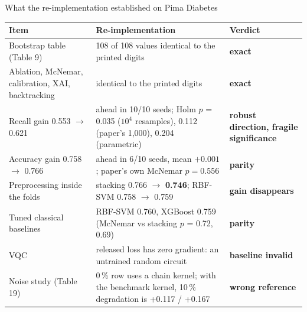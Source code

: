 \documentclass[aspectratio=169,10pt,t,xcolor={table}]{beamer}
\newcommand{\ok}[1]{\textcolor{qgreen}{\textbf{#1}}}
\newcommand{\bad}[1]{\textcolor{qred}{\textbf{#1}}}
\newcommand{\warn}[1]{\textcolor{qamber}{\textbf{#1}}}
\newcommand{\src}[1]{{\tiny\textcolor{gray}{#1}}}
\begin{document}
\begin{frame}{What the re-implementation established on Pima Diabetes}
\centering\scriptsize
\begin{tabularx}{\textwidth}{L{3.6cm} Y L{2.6cm}}
\toprule
Item & Re-implementation & Verdict \\
\midrule
Bootstrap table (Table 9) & 108 of 108 values identical to the printed digits & \ok{exact} \\
Ablation, McNemar, calibration, XAI, backtracking & identical to the printed digits & \ok{exact} \\
Recall gain 0.553 $\to$ 0.621 & ahead in 10/10 seeds; Holm $p$ = 0.035 ($10^4$ resamples), 0.112 (paper's 1,000), 0.204 (parametric) & \warn{robust direction, fragile significance} \\
Accuracy gain 0.758 $\to$ 0.766 & ahead in 6/10 seeds, mean $+0.001$; paper's own McNemar $p=0.556$ & \warn{parity} \\
Preprocessing inside the folds & stacking 0.766 $\to$ \textbf{0.746}; RBF-SVM 0.758 $\to$ 0.759 & \bad{gain disappears} \\
Tuned classical baselines & RBF-SVM 0.760, XGBoost 0.759 (McNemar vs stacking $p$ = 0.72, 0.69) & \warn{parity} \\
VQC & released loss has zero gradient: an untrained random circuit & \bad{baseline invalid} \\
Noise study (Table 19) & 0\,\% row uses a chain kernel; with the benchmark kernel, 10\,\% degradation is +0.117 / +0.167 & \bad{wrong reference} \\
\bottomrule
\end{tabularx}
\par\smallskip\src{Source: reimplementation/results/diabetes/ (see DIABETES\_REIMPLEMENTATION\_REPORT\_v2.pdf)}
\end{frame}
\end{document}
